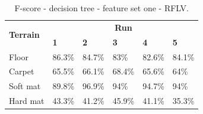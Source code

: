 \documentclass[USenglish]{ifimaster}  %
\begin{document}
\begin{table}[h]\ContinuedFloat
	\begin{subtable}[h]{1\textwidth}
		\centering
		\captionsetup{justification=centering}
			\begin{tabular}{@{}llllll@{}}
			\toprule
			\multirow{2}{*}{\textbf{Terrain}} & \multicolumn{5}{c}{\textbf{Run}} \\ \cmidrule(l){2-6} 
			& \multicolumn{1}{l|}{\textbf{1}} & \multicolumn{1}{l|}{\textbf{2}} & \multicolumn{1}{l|}{\textbf{3}} & \multicolumn{1}{l|}{\textbf{4}} & \textbf{5} \\ \midrule
			\multicolumn{1}{l|}{Floor} & \multicolumn{1}{l|}{86.3\%} & \multicolumn{1}{l|}{84.7\%} & \multicolumn{1}{l|}{83\%} & \multicolumn{1}{l|}{82.6\%} & 84.1\% \\ \midrule
			\multicolumn{1}{l|}{Carpet} & \multicolumn{1}{l|}{65.5\%} & \multicolumn{1}{l|}{66.1\%} & \multicolumn{1}{l|}{68.4\%} & \multicolumn{1}{l|}{65.6\%} & 64\% \\ \midrule
			\multicolumn{1}{l|}{Soft mat} & \multicolumn{1}{l|}{89.8\%} & \multicolumn{1}{l|}{96.9\%} & \multicolumn{1}{l|}{94\%} & \multicolumn{1}{l|}{94.7\%} & 94\% \\ \midrule
			\multicolumn{1}{l|}{Hard mat} & \multicolumn{1}{l|}{43.3\%} & \multicolumn{1}{l|}{41.2\%} & \multicolumn{1}{l|}{45.9\%} & \multicolumn{1}{l|}{41.1\%} & 35.3\% \\ \bottomrule
		\end{tabular}
		\caption{F-score - decision tree - feature set one - RFLV.}
		\label{dtfilterfscore}
	\end{subtable}
\end{table}
\end{document}
